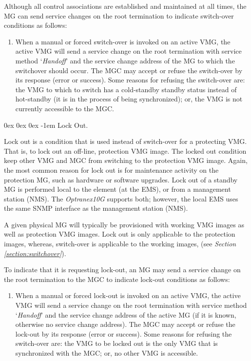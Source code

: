\documentclass[letterpaper,final,notitlepage,twocolumn,10pt,twoside]{article}
\makeatletter
\let\normalsize = \small
\let\small = \footnotesize
\let\footnotesize = \scriptsize
\let\scriptsize = \tiny
\renewcommand\subparagraph{\@startsection{subparagraph}{5}{\parindent}%
                                       {0ex \@plus 0ex \@minus 0ex}%
                                       {-1em}%
                                      {\normalfont\normalsize\bfseries\slshape}}
\makeatother
\begin{document}
Although all control associations are established and maintained at all times,
the MG can send service changes on the root termination to indicate
switch-over conditions as follows:

\begin{enumerate}

\item When a manual or forced switch-over is invoked on an active VMG, the
active VMG will send a service change on the root termination with service
method `{\it Handoff}' and the service change address of the MG to which the
switchover should occur.  The MGC may accept or refuse the switch-over by its
response (error or success).  Some reasons for refusing the switch-over are:
the VMG to which to switch has a cold-standby standby status instead of
hot-standby (it is in the process of being synchronized); or, the VMG is not
currently accessible to the MGC.

\end{enumerate}

\subparagraph{Lock Out.}
\label{section:lockout}

Lock out is a condition that is used instead of switch-over for a protecting
VMG.  That is, to lock out an off-line, protection VMG image.  The locked out
condition keep other VMG and MGC from switching to the protection VMG image.
Again, the most common reason for lock out is for maintenance activity on the
protection MG, such as hardware or software upgrades.  Lock out of a standby
MG is performed local to the element (at the EMS), or from a management
station (NMS).  The {\sl Optranex10G} supports both; however, the local EMS
uses the same SNMP interface as the management station (NMS).

A given physical MG will typically be provisioned with working VMG images as
well as protection VMG images.  Lock out is only applicable to the protection
images, whereas, switch-over is applicable to the working images, (see {\sl
Section \ref{section:switchover}}).

To indicate that it is requesting lock-out, an MG may send a service change on
the root termination to the MGC to indicate lock-out conditions as follows:

\begin{enumerate}

\item When a manual or forced lock-out is invoked on an active VMG, the active
VMG will send a service change on the root termination with service method
`{\it Handoff}' and the service change address of the active MG (if it is
known, otherwise no service change address).  The MGC may accept or refuse the
lock-out by its response (error or success).  Some reasons for refusing the
switch-over are:  the VMG to be locked out is the only VMG that is
synchronized with the MGC; or, no other VMG is accessible.

\end{enumerate}
\end{document}

